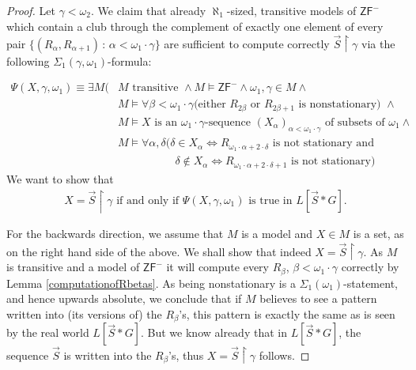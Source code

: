 \documentclass[10pt,a4paper]{amsart}
\newcommand{\ZFP}{\mathsf{ZF}^-}
\begin{document}
\begin{proof}
Let $\gamma < \omega_2$.
We claim that already $\aleph_1$-sized, transitive models of $\ZFP$ which contain a club through the complement of exactly one element of every pair $\{(R_{\alpha}, R_{\alpha+1}) \, : \, \alpha < \omega_1 \cdot \gamma\}$ are sufficient to compute correctly $\vec{S} \upharpoonright \gamma$ via the following $\Sigma_1(\gamma, \omega_1)$-formula: 

\begin{align*}
\Psi(X,\gamma, \omega_1) \equiv  \exists M (&M \text{ transitive } \land M \models \ZFP \land \omega_1,\gamma \in M \land
\\& M \models \forall \beta< \omega_1 \cdot \gamma (\text{either  $R_{2\beta}$ or $R_{2\beta+1}$ is nonstationary) } \land \\& 
M \models X \text{ is an $\omega_1 \cdot \gamma$-sequence $(X_{\alpha})_{\alpha < \omega_1 \cdot \gamma}$ of subsets of $\omega_1$} \land\\&
M \models  \forall \alpha, \delta (\delta \in X_{\alpha} \Leftrightarrow R_{\omega_1 \cdot \alpha + 2 \cdot \delta} \text{ is not stationary and} \\& \qquad \qquad \quad \,
\delta \notin X_{\alpha} \Leftrightarrow  R_{\omega_1 \cdot \alpha + 2 \cdot \delta +1} \text{ is not stationary})
\end{align*}
We want to show that 
\begin{align*}
X=\vec{S} \upharpoonright \gamma \text{ if and only if } \Psi(X,\gamma,\omega_1) \text{ is true in }L[\vec{S} \ast G].
\end{align*}

For the backwards direction, we assume that $M$ is a model and $X \in M$ is a set, as on the right hand side of the above. We shall show that indeed $X=\vec{S}\upharpoonright \gamma$.  As $M$ is transitive and a model of $\ZFP$ it will compute every $R_{\beta}$, $\beta < \omega_1 \cdot \gamma$ correctly by Lemma \ref{computationofRbetas}. As being nonstationary is a $\Sigma_1(\omega_1)$-statement, and hence upwards absolute, we conclude that if $M$ believes to see a pattern written into (its versions of) the $R_{\beta}$'s, this pattern is exactly the same as is seen by the real world $L[\vec{S} \ast G]$. But we know already that in $L[\vec{S} \ast G]$, the sequence $\vec{S}$ is written into the $R_{\beta}$'s, thus $X=\vec{S} \upharpoonright \gamma$ follows.


\end{proof}
\end{document}
